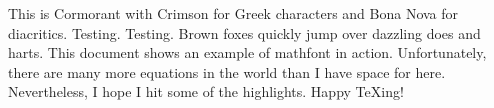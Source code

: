\documentclass[12pt]{article}
\begin{document}
\let\footnote\@gobble
\def\showabstract{0}
\let\textsf\relax
\let\ttfamily\relax
\def\documentname{Example---Cormorant}



This is Cormorant with Crimson for Greek characters and Bona Nova for diacritics. Testing. Testing. Brown foxes quickly jump over dazzling does and harts. This document shows an example of mathfont in action. Unfortunately, there are many more equations in the world than I have space for here. Nevertheless, I hope I hit some of the highlights. Happy \TeX ing!


\end{document}
